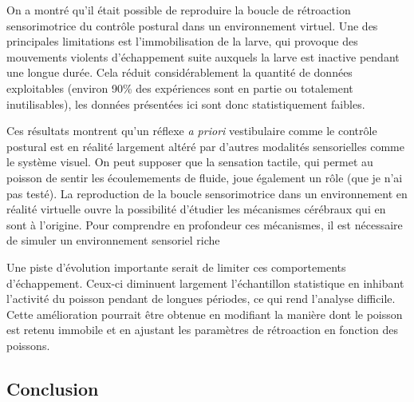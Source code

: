 
On a montré qu'il était possible de reproduire la boucle de rétroaction sensorimotrice du contrôle postural dans un environnement virtuel. Une des principales limitations est l'immobilisation de la larve, qui provoque des mouvements violents d'échappement suite auxquels la larve est inactive pendant une longue durée. Cela réduit considérablement la quantité de données exploitables (environ 90\% des expériences sont en partie ou totalement inutilisables), les données présentées ici sont donc statistiquement faibles.

Ces résultats montrent qu'un réflexe \emph{a priori} vestibulaire comme le contrôle postural est en réalité largement altéré par d'autres modalités sensorielles comme le système visuel. On peut supposer que la sensation tactile, qui permet au poisson de sentir les écoulemements de fluide, joue également un rôle (que je n'ai pas testé). La reproduction de la boucle sensorimotrice dans un environnement en réalité virtuelle ouvre la possibilité d'étudier les mécanismes cérébraux qui en sont à l'origine. Pour comprendre en profondeur ces mécanismes, il est nécessaire de simuler un environnement sensoriel riche  

Une piste d'évolution importante serait de limiter ces comportements d'échappement. 
Ceux-ci diminuent largement l'échantillon statistique en inhibant l'activité du poisson pendant de longues périodes, ce qui rend l'analyse difficile. Cette amélioration pourrait être obtenue en modifiant la manière dont le poisson est retenu immobile et en ajustant les paramètres de rétroaction en fonction des poissons. 

\subsection{Conclusion}


